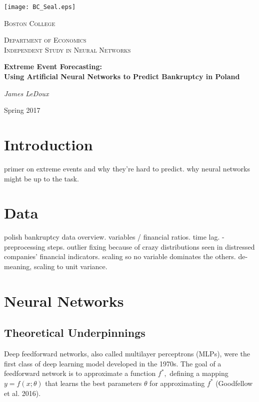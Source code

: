 \documentclass[12pt]{article}  %
\theoremstyle{definition}
\theoremstyle{remark}
\begin{document}
	\begin{titlepage}
		\centering
		\texttt{[image: BC\_Seal.eps]}\par\vspace{1cm}
		{\scshape\huge Boston College \par}
		\vspace{1cm}
		{\scshape\Large Department of Economics\\
		Independent Study in Neural Networks\par}
		\vspace{1.5cm}
		{\huge\bfseries Extreme Event Forecasting:\\ Using Artificial Neural Networks to Predict Bankruptcy in Poland\par}
		\vspace{2cm}
		{\Large\itshape
		James LeDoux}
		\vfill

		{\large Spring 2017\par}
	\end{titlepage}

\section{Introduction}
primer on extreme events and why they're hard to predict. why neural networks might be up to the task. 

\section{Data}
polish bankruptcy data overview. variables / financial ratios. time lag. 
- preprocessing steps. outlier fixing because of crazy distributions seen in distressed companies' financial indicators. scaling so no variable dominates the others. de-meaning, scaling to unit variance. 

\section{Neural Networks}
\subsection{Theoretical Underpinnings}
\par Deep feedforward networks, also called multilayer perceptrons (MLPs), were the first class of deep learning model developed in the 1970s.  The goal of a feedforward network is to approximate a function $f^{*},$ defining a mapping $y=f(x;\theta)$ that learns the best parameters $\theta$ for approximating $f^{*}$ (Goodfellow et al. 2016). 
\end{document}
